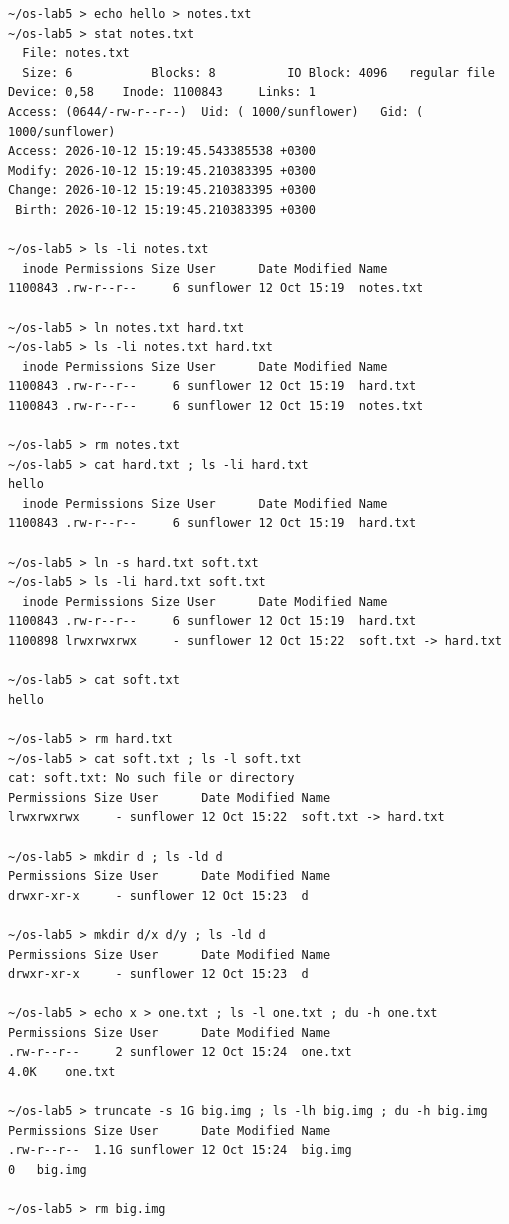 \documentclass[12pt,a4paper]{article}
\begin{document}
\begin{lstlisting}[style=consolestyle]
~/os-lab5 > echo hello > notes.txt
~/os-lab5 > stat notes.txt
  File: notes.txt
  Size: 6         	Blocks: 8          IO Block: 4096   regular file
Device: 0,58	Inode: 1100843     Links: 1
Access: (0644/-rw-r--r--)  Uid: ( 1000/sunflower)   Gid: ( 1000/sunflower)
Access: 2026-10-12 15:19:45.543385538 +0300
Modify: 2026-10-12 15:19:45.210383395 +0300
Change: 2026-10-12 15:19:45.210383395 +0300
 Birth: 2026-10-12 15:19:45.210383395 +0300

~/os-lab5 > ls -li notes.txt
  inode Permissions Size User      Date Modified Name
1100843 .rw-r--r--     6 sunflower 12 Oct 15:19  notes.txt

~/os-lab5 > ln notes.txt hard.txt
~/os-lab5 > ls -li notes.txt hard.txt
  inode Permissions Size User      Date Modified Name
1100843 .rw-r--r--     6 sunflower 12 Oct 15:19  hard.txt
1100843 .rw-r--r--     6 sunflower 12 Oct 15:19  notes.txt

~/os-lab5 > rm notes.txt
~/os-lab5 > cat hard.txt ; ls -li hard.txt
hello
  inode Permissions Size User      Date Modified Name
1100843 .rw-r--r--     6 sunflower 12 Oct 15:19  hard.txt

~/os-lab5 > ln -s hard.txt soft.txt
~/os-lab5 > ls -li hard.txt soft.txt
  inode Permissions Size User      Date Modified Name
1100843 .rw-r--r--     6 sunflower 12 Oct 15:19  hard.txt
1100898 lrwxrwxrwx     - sunflower 12 Oct 15:22  soft.txt -> hard.txt

~/os-lab5 > cat soft.txt
hello

~/os-lab5 > rm hard.txt
~/os-lab5 > cat soft.txt ; ls -l soft.txt
cat: soft.txt: No such file or directory
Permissions Size User      Date Modified Name
lrwxrwxrwx     - sunflower 12 Oct 15:22  soft.txt -> hard.txt

~/os-lab5 > mkdir d ; ls -ld d
Permissions Size User      Date Modified Name
drwxr-xr-x     - sunflower 12 Oct 15:23  d

~/os-lab5 > mkdir d/x d/y ; ls -ld d
Permissions Size User      Date Modified Name
drwxr-xr-x     - sunflower 12 Oct 15:23  d

~/os-lab5 > echo x > one.txt ; ls -l one.txt ; du -h one.txt
Permissions Size User      Date Modified Name
.rw-r--r--     2 sunflower 12 Oct 15:24  one.txt
4.0K	one.txt

~/os-lab5 > truncate -s 1G big.img ; ls -lh big.img ; du -h big.img
Permissions Size User      Date Modified Name
.rw-r--r--  1.1G sunflower 12 Oct 15:24  big.img
0	big.img

~/os-lab5 > rm big.img
\end{lstlisting}
\end{document}
